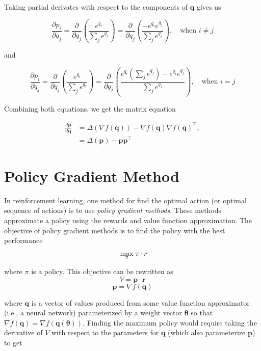 \documentclass[10pt]{article}
\theoremstyle{definition}
\begin{document}
\noindent
Taking partial derivates with respect to the components of $\mathbf{q}$ gives us

$$
\frac{\partial p_i}{\partial q_j} = \frac{\partial}{\partial q_j} \left(\frac{e^{q_i}}{\sum_j e^{q_j}} \right) = \frac{\partial}{\partial q_j} \left(\frac{-e^{q_i}e^{q_j}}{\sum_j e^{q_j}} \right), \quad \text{when $i\neq j$}
$$

\noindent
and

$$
\frac{\partial p_i}{\partial q_j} = \frac{\partial}{\partial q_j} \left(\frac{e^{q_i}}{\sum_j e^{q_j}} \right) = \frac{\partial}{\partial q_j} \left(\frac{e^{q_i}(\sum_j e^{q_j})-e^{q_i}e^{q_j}}{\sum_j e^{q_j}} \right), \quad \text{when $i=j$}
$$

\noindent
Combining both equations, we get the matrix equation

\begin{equation*}
\begin{aligned}
\frac{d\mathbf{p}}{d\mathbf{q}} & = \Delta(\nabla f(\mathbf{q})) - \nabla f(\mathbf{q})\nabla f(\mathbf{q})^\top, \\
& = \Delta(\mathbf{p}) - \mathbf{p}\mathbf{p}^\top
\end{aligned}
\end{equation*}

\section*{Policy Gradient Method}

In reinforcement learning, one method for find the optimal action (or optimal sequence of actions) is to use \emph{policy gradient methods}. These methods approximate a policy using the rewards and value function approximation. The objective of policy gradient methods is to find the policy with the best performance

$$
\max_{\pi} \pi \cdot r
$$

\noindent
where $\pi$ is a policy. This objective can be rewritten as
$$
V = \mathbf{p} \cdot \mathbf{r}
$$
$$
\mathbf{p} = \nabla f(\mathbf{q})
$$

\noindent
where $\mathbf{q}$ is a vector of values produced from some value function approximator (i.e., a neural network) parameterized by a weight vector $\pmb{\theta}$ so that $\nabla f(\mathbf{q}) = \nabla f(\mathbf{q}(\pmb{\theta}))$. Finding the maximum policy would require taking the derivative of $V$ with respect to the parameters for $\mathbf{q}$ (which also parameterize $\mathbf{p}$) to get
\end{document}
